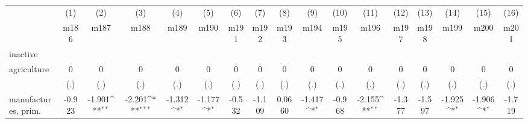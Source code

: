 {
\def\sym#1{\ifmmode^{#1}\else\(^{#1}\)\fi}
\begin{tabular}{l*{16}{c}}
\hline\hline
                    &\multicolumn{1}{c}{(1)}&\multicolumn{1}{c}{(2)}&\multicolumn{1}{c}{(3)}&\multicolumn{1}{c}{(4)}&\multicolumn{1}{c}{(5)}&\multicolumn{1}{c}{(6)}&\multicolumn{1}{c}{(7)}&\multicolumn{1}{c}{(8)}&\multicolumn{1}{c}{(9)}&\multicolumn{1}{c}{(10)}&\multicolumn{1}{c}{(11)}&\multicolumn{1}{c}{(12)}&\multicolumn{1}{c}{(13)}&\multicolumn{1}{c}{(14)}&\multicolumn{1}{c}{(15)}&\multicolumn{1}{c}{(16)}\\
                    &\multicolumn{1}{c}{m186}&\multicolumn{1}{c}{m187}&\multicolumn{1}{c}{m188}&\multicolumn{1}{c}{m189}&\multicolumn{1}{c}{m190}&\multicolumn{1}{c}{m191}&\multicolumn{1}{c}{m192}&\multicolumn{1}{c}{m193}&\multicolumn{1}{c}{m194}&\multicolumn{1}{c}{m195}&\multicolumn{1}{c}{m196}&\multicolumn{1}{c}{m197}&\multicolumn{1}{c}{m198}&\multicolumn{1}{c}{m199}&\multicolumn{1}{c}{m200}&\multicolumn{1}{c}{m201}\\
\hline
inactive            &                     &                     &                     &                     &                     &                     &                     &                     &                     &                     &                     &                     &                     &                     &                     &                     \\
agriculture         &           0         &           0         &           0         &           0         &           0         &           0         &           0         &           0         &           0         &           0         &           0         &           0         &           0         &           0         &           0         &           0         \\
                    &         (.)         &         (.)         &         (.)         &         (.)         &         (.)         &         (.)         &         (.)         &         (.)         &         (.)         &         (.)         &         (.)         &         (.)         &         (.)         &         (.)         &         (.)         &         (.)         \\
[1em]
manufactures, prim. &      -0.923         &      -1.901\sym{**} &      -2.201\sym{***}&      -1.312\sym{*}  &      -1.177\sym{*}  &      -0.532         &      -1.109         &      0.0660         &      -1.417\sym{*}  &      -0.968         &      -2.155\sym{**} &      -1.377         &      -1.597         &      -1.925\sym{*}  &      -1.906\sym{*}  &      -1.719         \\

\end{tabular}}
